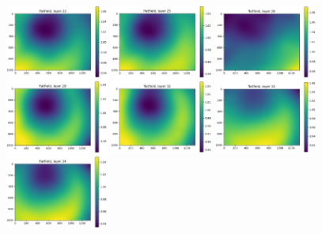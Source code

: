 \documentclass[letterpaper,11pt]{article}
\begin{document}
\begin{figure}[!ht]
\includegraphics[width=0.3\textwidth]{images/results/flatfield_layers_vectra/flatfield_layer_22}
\includegraphics[width=0.3\textwidth]{images/results/flatfield_layers_vectra/flatfield_layer_25}
\includegraphics[width=0.3\textwidth]{images/results/flatfield_layers_vectra/flatfield_layer_26}
\includegraphics[width=0.3\textwidth]{images/results/flatfield_layers_vectra/flatfield_layer_29}
\includegraphics[width=0.3\textwidth]{images/results/flatfield_layers_vectra/flatfield_layer_32}
\includegraphics[width=0.3\textwidth]{images/results/flatfield_layers_vectra/flatfield_layer_33}
\includegraphics[width=0.3\textwidth]{images/results/flatfield_layers_vectra/flatfield_layer_34}

\end{figure}
\end{document}
